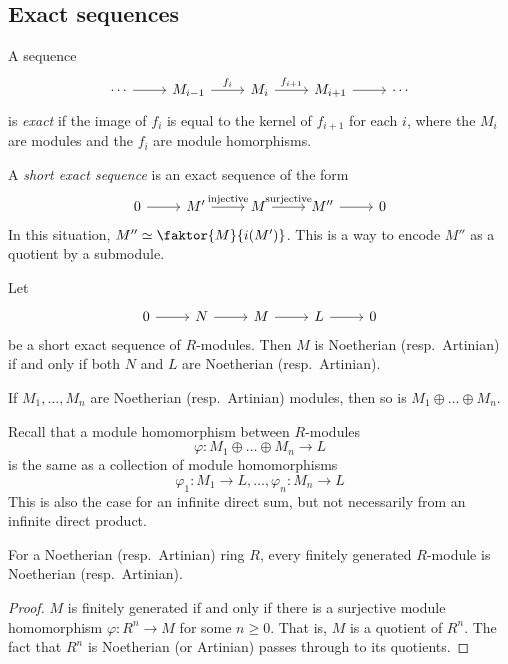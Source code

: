 \subsection{Exact sequences}
\begin{definition}
    A sequence
    \[\begin{tikzcd}
        \cdots & {M_{i-1}} & {M_i} & {M_{i+1}} & \cdots
        \arrow[from=1-1, to=1-2]
        \arrow["{f_i}", from=1-2, to=1-3]
        \arrow["{f_{i+1}}", from=1-3, to=1-4]
        \arrow[from=1-4, to=1-5]
    \end{tikzcd}\]
    is \emph{exact} if the image of \( f_i \) is equal to the kernel of \( f_{i+1} \) for each \( i \), where the \( M_i \) are modules and the \( f_i \) are module homorphisms.
\end{definition}
\begin{definition}
    A \emph{short exact sequence} is an exact sequence of the form
    \[\begin{tikzcd}
        0 & {M'} & M & {M''} & 0
        \arrow[from=1-1, to=1-2]
        \arrow["{\text{injective}}", from=1-2, to=1-3]
        \arrow["{\text{surjective}}", from=1-3, to=1-4]
        \arrow[from=1-4, to=1-5]
    \end{tikzcd}\]
    In this situation, \( M'' \simeq \faktor{M}{i(M')} \).
    This is a way to encode \( M'' \) as a quotient by a submodule.
\end{definition}
\begin{lemma}
    Let
    \[\begin{tikzcd}
        0 & N & M & L & 0
        \arrow[from=1-1, to=1-2]
        \arrow[from=1-2, to=1-3]
        \arrow[from=1-3, to=1-4]
        \arrow[from=1-4, to=1-5]
    \end{tikzcd}\]
    be a short exact sequence of \( R \)-modules.
    Then \( M \) is Noetherian (resp.\ Artinian) if and only if both \( N \) and \( L \) are Noetherian (resp.\ Artinian).
\end{lemma}
\begin{corollary}
    If \( M_1, \dots, M_n \) are Noetherian (resp.\ Artinian) modules, then so is \( M_1 \oplus \dots \oplus M_n \).
\end{corollary}
Recall that a module homomorphism between \( R \)-modules
\[ \varphi : M_1 \oplus \dots \oplus M_n \to L \]
is the same as a collection of module homomorphisms
\[ \varphi_1 : M_1 \to L, \dots, \varphi_n : M_n \to L \]
This is also the case for an infinite direct sum, but not necessarily from an infinite direct product.
\begin{proposition}
    For a Noetherian (resp.\ Artinian) ring \( R \), every finitely generated \( R \)-module is Noetherian (resp.\ Artinian).
\end{proposition}
\begin{proof}
    \( M \) is finitely generated if and only if there is a surjective module homomorphism \( \varphi : R^n \to M \) for some \( n \geq 0 \).
    That is, \( M \) is a quotient of \( R^n \).
    The fact that \( R^n \) is Noetherian (or Artinian) passes through to its quotients.
\end{proof}

